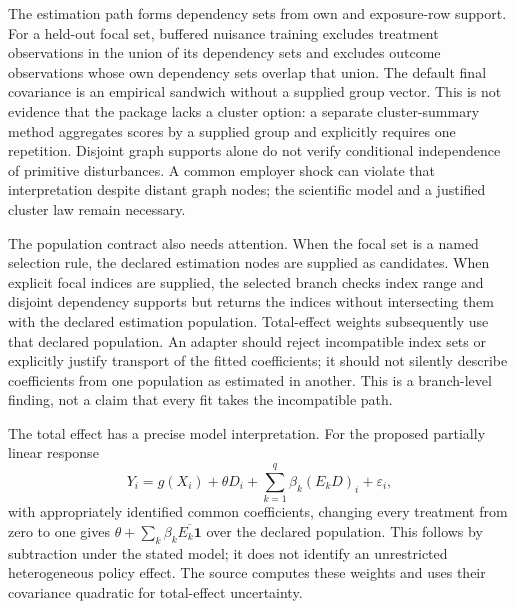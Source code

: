 The estimation path forms dependency sets from own and exposure-row support. For a held-out focal set, buffered nuisance training excludes treatment observations in the union of its dependency sets and excludes outcome observations whose own dependency sets overlap that union. The default final covariance is an empirical sandwich without a supplied group vector. This is not evidence that the package lacks a cluster option: a separate cluster-summary method aggregates scores by a supplied group and explicitly requires one repetition. Disjoint graph supports alone do not verify conditional independence of primitive disturbances. A common employer shock can violate that interpretation despite distant graph nodes; the scientific model and a justified cluster law remain necessary.\citep{exec25_pnet_dml}

The population contract also needs attention. When the focal set is a named selection rule, the declared estimation nodes are supplied as candidates. When explicit focal indices are supplied, the selected branch checks index range and disjoint dependency supports but returns the indices without intersecting them with the declared estimation population. Total-effect weights subsequently use that declared population. An adapter should reject incompatible index sets or explicitly justify transport of the fitted coefficients; it should not silently describe coefficients from one population as estimated in another. This is a branch-level finding, not a claim that every fit takes the incompatible path.\citep{exec25_pnet_dml}

The total effect has a precise model interpretation. For the proposed partially linear response
\[
 Y_i=g(X_i)+\theta D_i+\sum_{k=1}^q\beta_k(E_kD)_i+\varepsilon_i,
\]
with appropriately identified common coefficients, changing every treatment from zero to one gives $\theta+\sum_k\beta_k\overline{E_k\mathbf1}$ over the declared population. This follows by subtraction under the stated model; it does not identify an unrestricted heterogeneous policy effect. The source computes these weights and uses their covariance quadratic for total-effect uncertainty.\citep{exec25_pnet_dml,exec25_pnet_choice}

